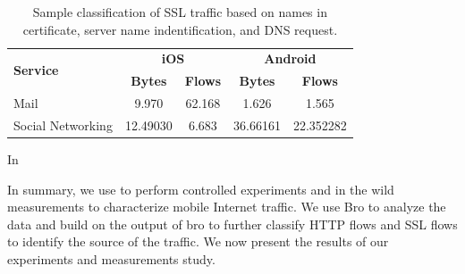 \begin{table}
\centering
\begin{small}
\begin{tabular}{|p{}|c|c|c|c|}
\hline
\multirow{2}{*}{\bf Service} & \multicolumn{2}{c|}{\bf iOS} &  \multicolumn{2}{c|}{\bf Android} \tabularnewline
\cline{2-5}
  & {\bf Bytes}  & {\bf Flows} & {\bf Bytes} & {\bf Flows} \tabularnewline
\hline
Mail                 & 9.970  & 62.168  & 1.626 & 1.565 \tabularnewline
\hline
Social Networking    & 12.49030 & 6.683  & 36.66161 & 22.352282 \tabularnewline
\hline
\end{tabular}
\end{small}
\caption{Sample classification of SSL traffic based on names in certificate, server name indentification, and DNS request.}
\label{tab:classify-ssl-traffic}
\end{table}

In 



In summary, we use \platname to perform controlled experiments and in the wild measurements to characterize mobile Internet traffic. 
We use Bro to analyze the data and build on the output of bro to further classify HTTP flows and SSL flows to identify the source of the traffic. 
We now present the results of our experiments and measurements study. 





